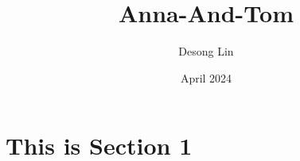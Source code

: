 \documentclass[twoside]{book}
\title{\fontsize{18}{19}\selectfont Anna-And-Tom}
\author{Desong Lin}
\date{April 2024}
\begin{document}
\maketitle
\fontsize{13}{15}\selectfont

\section{This is Section 1}
\end{document}

